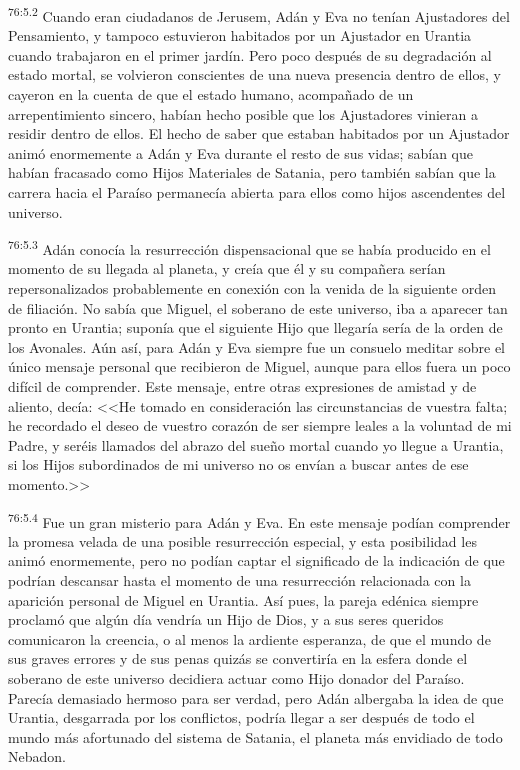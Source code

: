 \par
\textsuperscript{76:5.2} Cuando eran ciudadanos de Jerusem, Adán y Eva no tenían Ajustadores del Pensamiento, y tampoco estuvieron habitados por un Ajustador en Urantia cuando trabajaron en el primer jardín. Pero poco después de su degradación al estado mortal, se volvieron conscientes de una nueva presencia dentro de ellos, y cayeron en la cuenta de que el estado humano, acompañado de un arrepentimiento sincero, habían hecho posible que los Ajustadores vinieran a residir dentro de ellos. El hecho de saber que estaban habitados por un Ajustador animó enormemente a Adán y Eva durante el resto de sus vidas; sabían que habían fracasado como Hijos Materiales de Satania, pero también sabían que la carrera hacia el Paraíso permanecía abierta para ellos como hijos ascendentes del universo.

\par
\textsuperscript{76:5.3} Adán conocía la resurrección dispensacional que se había producido en el momento de su llegada al planeta, y creía que él y su compañera serían repersonalizados probablemente en conexión con la venida de la siguiente orden de filiación. No sabía que Miguel, el soberano de este universo, iba a aparecer tan pronto en Urantia; suponía que el siguiente Hijo que llegaría sería de la orden de los Avonales. Aún así, para Adán y Eva siempre fue un consuelo meditar sobre el único mensaje personal que recibieron de Miguel, aunque para ellos fuera un poco difícil de comprender. Este mensaje, entre otras expresiones de amistad y de aliento, decía: <<He tomado en consideración las circunstancias de vuestra falta; he recordado el deseo de vuestro corazón de ser siempre leales a la voluntad de mi Padre, y seréis llamados del abrazo del sueño mortal cuando yo llegue a Urantia, si los Hijos subordinados de mi universo no os envían a buscar antes de ese momento.>>

\par
\textsuperscript{76:5.4} Fue un gran misterio para Adán y Eva. En este mensaje podían comprender la promesa velada de una posible resurrección especial, y esta posibilidad les animó enormemente, pero no podían captar el significado de la indicación de que podrían descansar hasta el momento de una resurrección relacionada con la aparición personal de Miguel en Urantia. Así pues, la pareja edénica siempre proclamó que algún día vendría un Hijo de Dios, y a sus seres queridos comunicaron la creencia, o al menos la ardiente esperanza, de que el mundo de sus graves errores y de sus penas quizás se convertiría en la esfera donde el soberano de este universo decidiera actuar como Hijo donador del Paraíso. Parecía demasiado hermoso para ser verdad, pero Adán albergaba la idea de que Urantia, desgarrada por los conflictos, podría llegar a ser después de todo el mundo más afortunado del sistema de Satania, el planeta más envidiado de todo Nebadon.

